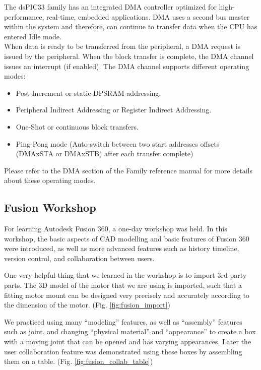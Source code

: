 \vskip 0.2in
\noindent
The dsPIC33 family has an integrated DMA controller optimized for high-performance, real-time, embedded applications. DMA uses a second bus master within the system and therefore, can continue to transfer data when the CPU has entered Idle mode.\\
When data is ready to be transferred from the peripheral, a DMA request is issued by the peripheral. When the block transfer is complete, the DMA channel issues an interrupt (if enabled).
\vskip 0.2in
\noindent
The DMA channel supports different operating modes:
\begin{itemize}
    \item Post-Increment or static DPSRAM addressing.
    \item Peripheral Indirect Addressing or Register Indirect Addressing.
    \item One-Shot or continuous block transfers.
    \item Ping-Pong mode (Auto-switch between two start addresses offsets (DMAxSTA or DMAxSTB) after each transfer complete)
\end{itemize}

\noindent
Please refer to the DMA section of the Family reference manual \cite{dma} for more details about these operating modes.


\subsection{Fusion Workshop}
For learning Autodesk Fusion 360, a one-day workshop was held. In this workshop, the basic aspects of CAD modelling and basic features of Fusion 360 were introduced, as well as more advanced features such as history timeline, version control, and collaboration between users.

One very helpful thing that we learned in the workshop is to import 3rd party parts. The 3D model of the motor that we are using is imported, such that a fitting motor mount can be designed very precisely and accurately according to the dimension of the motor. (Fig. \ref{fig:fusion_import})

We practiced using many “modeling” features, as well as “assembly” features such as joint, and changing “physical material” and “appearance” to create a box with a moving joint that can be opened and has varying appearances. Later the user collaboration feature was demonstrated using these boxes by assembling them on a table. (Fig. \ref{fig:fusion_collab_table})

